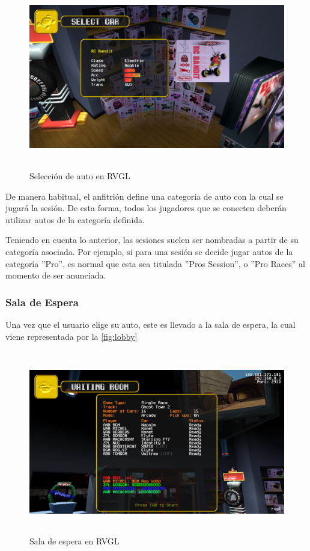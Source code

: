 \begin{figure}[H]
  \begin{center}
    \includegraphics[width=15cm, height=8cm]{img/bandit.png}
  \end{center}
  \caption[Selección de auto en RVGL]{Selección de auto en RVGL}
  \label{fig:bandit}
\end{figure}

De manera habitual, el anfitrión define una categoría de auto con la cual se jugará la sesión. De esta forma, todos los jugadores que se conecten deberán utilizar autos de la categoría definida.

Teniendo en cuenta lo anterior, las sesiones suelen ser nombradas a partir de su categoría asociada. Por ejemplo, si para una sesión se decide jugar autos de la categoría ''Pro'', es normal que esta sea titulada  ''Pros Session'', o ''Pro Races'' al momento de ser anunciada.

\subsubsection{Sala de Espera}
Una vez que el usuario elige su auto, este es llevado a la sala de espera, la cual viene representada por la \autoref{fig:lobby}

\begin{figure}[H]
  \begin{center}
    \includegraphics[width=15cm, height=8cm]{img/lobby.png}
  \end{center}
  \caption[Sala de espera en RVGL]{Sala de espera en RVGL}
  \label{fig:lobby}
\end{figure}

